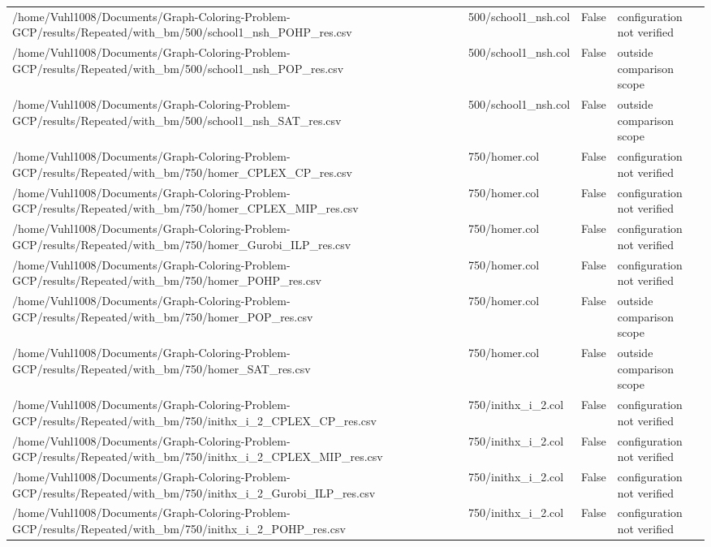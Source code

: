 \begin{table}[htbp]
\begin{tabular}{llll}
/home/Vuhl1008/Documents/Graph-Coloring-Problem-GCP/results/Repeated/with\_bm/500/school1\_nsh\_POHP\_res.csv & 500/school1\_nsh.col & False & configuration not verified \\
/home/Vuhl1008/Documents/Graph-Coloring-Problem-GCP/results/Repeated/with\_bm/500/school1\_nsh\_POP\_res.csv & 500/school1\_nsh.col & False & outside comparison scope \\
/home/Vuhl1008/Documents/Graph-Coloring-Problem-GCP/results/Repeated/with\_bm/500/school1\_nsh\_SAT\_res.csv & 500/school1\_nsh.col & False & outside comparison scope \\
/home/Vuhl1008/Documents/Graph-Coloring-Problem-GCP/results/Repeated/with\_bm/750/homer\_CPLEX\_CP\_res.csv & 750/homer.col & False & configuration not verified \\
/home/Vuhl1008/Documents/Graph-Coloring-Problem-GCP/results/Repeated/with\_bm/750/homer\_CPLEX\_MIP\_res.csv & 750/homer.col & False & configuration not verified \\
/home/Vuhl1008/Documents/Graph-Coloring-Problem-GCP/results/Repeated/with\_bm/750/homer\_Gurobi\_ILP\_res.csv & 750/homer.col & False & configuration not verified \\
/home/Vuhl1008/Documents/Graph-Coloring-Problem-GCP/results/Repeated/with\_bm/750/homer\_POHP\_res.csv & 750/homer.col & False & configuration not verified \\
/home/Vuhl1008/Documents/Graph-Coloring-Problem-GCP/results/Repeated/with\_bm/750/homer\_POP\_res.csv & 750/homer.col & False & outside comparison scope \\
/home/Vuhl1008/Documents/Graph-Coloring-Problem-GCP/results/Repeated/with\_bm/750/homer\_SAT\_res.csv & 750/homer.col & False & outside comparison scope \\
/home/Vuhl1008/Documents/Graph-Coloring-Problem-GCP/results/Repeated/with\_bm/750/inithx\_i\_2\_CPLEX\_CP\_res.csv & 750/inithx\_i\_2.col & False & configuration not verified \\
/home/Vuhl1008/Documents/Graph-Coloring-Problem-GCP/results/Repeated/with\_bm/750/inithx\_i\_2\_CPLEX\_MIP\_res.csv & 750/inithx\_i\_2.col & False & configuration not verified \\
/home/Vuhl1008/Documents/Graph-Coloring-Problem-GCP/results/Repeated/with\_bm/750/inithx\_i\_2\_Gurobi\_ILP\_res.csv & 750/inithx\_i\_2.col & False & configuration not verified \\
/home/Vuhl1008/Documents/Graph-Coloring-Problem-GCP/results/Repeated/with\_bm/750/inithx\_i\_2\_POHP\_res.csv & 750/inithx\_i\_2.col & False & configuration not verified \\

\end{tabular}
\end{table}
